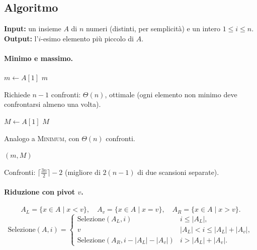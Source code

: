 \subsection{Algoritmo}
\begin{definizione}
	\textbf{Input:} un insieme $A$ di $n$ numeri (distinti, per semplicità) e un intero $1\le i\le n$.\newline
	\textbf{Output:} l'$i$-esimo elemento più piccolo di $A$.
\end{definizione}

\paragraph{Minimo e massimo.}
\begin{algorithm}[H]
	\caption{\textsc{Minimum}$(A)$}
	$m\gets A[1]$\;
	\Return $m$\;
\end{algorithm}
Richiede $n-1$ confronti: $\Theta(n)$, ottimale (ogni elemento non minimo deve confrontarsi almeno una volta).

\begin{algorithm}[H]
	\caption{\textsc{Maximum}$(A)$}
	$M\gets A[1]$\;
	\Return $M$\;
\end{algorithm}
Analogo a \textsc{Minimum}, con $\Theta(n)$ confronti.

\begin{algorithm}[H]
	\caption{\textsc{MinMax}$(A)$}
	\Return $(m,M)$\;
\end{algorithm}
Confronti: $\lceil\frac{3n}{2}\rceil-2$ (migliore di $2(n-1)$ di due scansioni separate).

\paragraph{Riduzione con pivot $v$.}
\[
A_L=\{x\in A\mid x<v\},\quad
A_v=\{x\in A\mid x=v\},\quad
A_R=\{x\in A\mid x>v\}.
\]
\[
\text{Selezione}(A,i)=
\begin{cases}
\text{Selezione}(A_L,i) & i\le |A_L|,\\
v & |A_L|<i\le |A_L|+|A_v|,\\
\text{Selezione}(A_R,i-|A_L|-|A_v|) & i>|A_L|+|A_v|.
\end{cases}
\]


